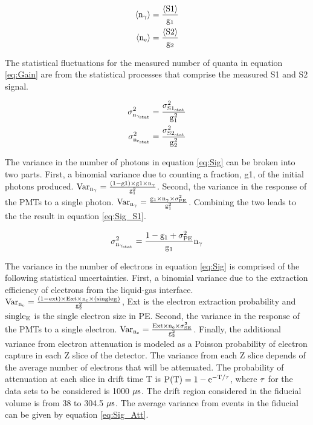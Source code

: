 \begin{equation}
\begin{split}
\rm  \left<n_\gamma\right> = \frac{\left<S1\right>}{g_1}\\
\rm \left<n_{e}\right> = \frac{\left<S2\right>}{g_2}
\label{eq:Gain}
\end{split}
\end{equation}

The statistical fluctuations for the measured number of quanta in equation \ref{eq:Gain} are from the statistical processes that comprise the measured S1 and S2 signal.

\begin{equation}
\begin{split}
\rm  \sigma_{n_{\gamma_{stat}}}^2 = \frac{\sigma_{S1_{stat}}^2}{g_1^2}\\
\rm \sigma_{n_{e_{stat}}}^2 = \frac{\sigma_{S2_{stat}}^2}{g_2^2}
\label{eq:Sig}
\end{split}
\end{equation}

The variance in the number of photons in equation \ref{eq:Sig} can be broken into two parts. First, a binomial variance due to counting a fraction, g1, of the initial photons produced. $\rm Var_{n_\gamma} = \frac{(1-g1)\times g1\times n_\gamma}{g_1^2}$. Second, the variance in the response of the PMTs to a single photon. $\rm Var_{n_\gamma} = \frac{g_1\times n_\gamma \times \sigma_{PE}^2}{g_1^2}$. Combining the two leads to the the result in equation \ref{eq:Sig_S1}.

\begin{equation}
\rm  \sigma_{n_{\gamma_{stat}}}^2 = \frac{1-g_1+\sigma_{PE}^2}{g_1} n_\gamma\\
\label{eq:Sig_S1}
\end{equation}


The variance in the number of electrons in equation \ref{eq:Sig} is comprised of the following statistical uncertainties. First, a binomial variance due to the extraction efficiency of electrons from the liquid-gas interface. $\rm Var_{n_e} = \frac{(1-ext)\times Ext\times n_e \times(single_E)}{g_2^2}$, Ext is the electron extraction probability and $\rm single_E$ is the single electron size in PE. Second, the variance in the response of the PMTs to a single electron. $\rm Var_{n_e} = \frac{Ext\times n_e \times \sigma_{SE}^2}{g_2^2}$. Finally, the additional variance from electron attenuation is modeled as a Poisson probability of electron capture in each Z slice of the detector. The variance from each Z slice depends of the average number of electrons that will be attenuated. The probability of attenuation at each slice in drift time T is $\rm P(T)= 1-e^{-T/\tau}$, where $\rm \tau$ for the data sets to be considered is 1000 $\rm \mu s$. The drift region considered in the fiducial volume is from 38 to 304.5 $\rm \mu s$. The average variance from events in the fiducial can be given by equation \ref{eq:Sig_Att}.

